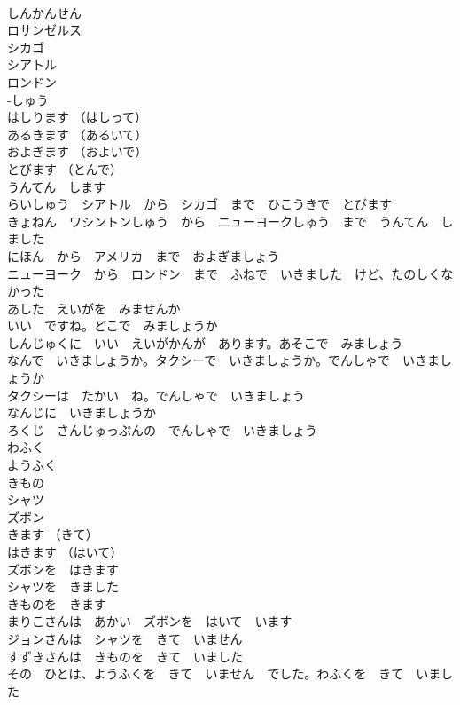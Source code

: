 \documentclass[8pt]{extreport}
\begin{document}
\begin{CJK}{UTF8}{min}
\\	しんかんせん	
\\	ロサンゼルス	
\\	シカゴ	
\\	シアトル	
\\	ロンドン	
\\	-しゅう 
\\	はしります （はしって）	
\\	あるきます （あるいて）	
\\	およぎます （およいで）	
\\	とびます （とんで）	
\\	うんてん　します	
\\	らいしゅう　シアトル　から　シカゴ　まで　ひこうきで　とびます	
\\	きょねん　ワシントンしゅう　から　ニューヨークしゅう　まで　うんてん　しました	
\\	にほん　から　アメリカ　まで　およぎましょう	
\\	ニューヨーク　から　ロンドン　まで　ふねで　いきました　けど、たのしくなかった	
\\	あした　えいがを　みませんか	
\\	いい　ですね。どこで　みましょうか	
\\	しんじゅくに　いい　えいがかんが　あります。あそこで　みましょう	
\\	なんで　いきましょうか。タクシーで　いきましょうか。でんしゃで　いきましょうか	
\\	タクシーは　たかい　ね。でんしゃで　いきましょう	
\\	なんじに　いきましょうか	
\\	ろくじ　さんじゅっぷんの　でんしゃで　いきましょう	
\\	わふく	
\\	ようふく	
\\	きもの	
\\	シャツ	
\\	ズボン	
\\	きます （きて） 
\\	はきます （はいて）	
\\	ズボンを　はきます	
\\	シャツを　きました	
\\	きものを　きます	
\\	まりこさんは　あかい　ズボンを　はいて　います	
\\	ジョンさんは　シャツを　きて　いません	
\\	すずきさんは　きものを　きて　いました	
\\	その　ひとは、ようふくを　きて　いません　でした。わふくを　きて　いました	

\end{CJK}
\end{document}
